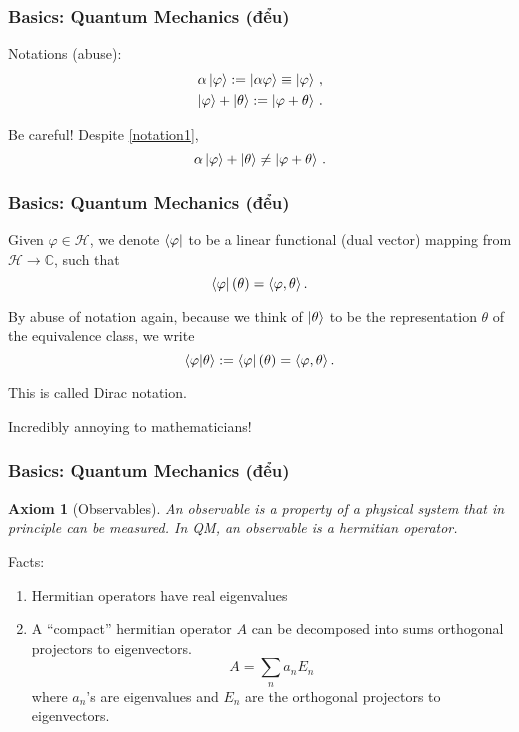 \documentclass[12pt]{beamer}
\newtheorem{axiom}{Axiom}
\begin{document}
\begin{frame}
\frametitle{Basics: Quantum Mechanics (đểu)}
    Notations (abuse): 
    \begin{gather}
        \alpha \ket{\varphi} := \ket{\alpha \varphi}\equiv \ket{\varphi} \,, \label{notation1} \\
    \ket{\varphi} + \ket{\theta} :=  \ket{\varphi + \theta}\,.
    \end{gather}


    Be careful! Despite \eqref{notation1}, 
    \begin{equation*}
        \alpha\ket{\varphi} + \ket{\theta} \not= \ket{\varphi + \theta}\,.
    \end{equation*}
\end{frame}


\begin{frame}
\frametitle{Basics: Quantum Mechanics (đểu)}
    Given $\varphi \in \mathcal{H}$, we denote $\bra{\varphi}$ to be a linear 
    functional (dual vector) mapping from $\mathcal{H} \to \mathbb{C}$, such that
    \begin{equation*}
    \bra{\varphi} (\theta) = \langle \varphi, \theta \rangle \,.
    \end{equation*}

    By abuse of notation again, because we think of $\ket{\theta}$
    to be the representation $\theta$ of the equivalence class,
    we write
    \begin{equation*}
        \braket{ \varphi}{ \theta } := \bra{\varphi}(\theta)=  \langle \varphi, \theta \rangle \,.
    \end{equation*}
    
    This is called Dirac notation.

    \pause
    Incredibly annoying to mathematicians!
\end{frame}


\begin{frame}
\frametitle{Basics: Quantum Mechanics (đểu)}
\begin{axiom}[Observables]
    An observable is a property of a physical system that in principle can be measured.
    In QM, an observable is a hermitian operator.
\end{axiom}
    Facts:
    \begin{enumerate}
        \item Hermitian operators have real eigenvalues
        \item A ``compact'' hermitian operator $A$ can be decomposed into sums orthogonal projectors to eigenvectors.
   \begin{equation*}
       A =  \sum_n a_n E_n
   \end{equation*}
   where
   $a_n$'s are eigenvalues and $E_n$ are the orthogonal projectors to eigenvectors.
    \end{enumerate}
\end{frame}
\end{document}

